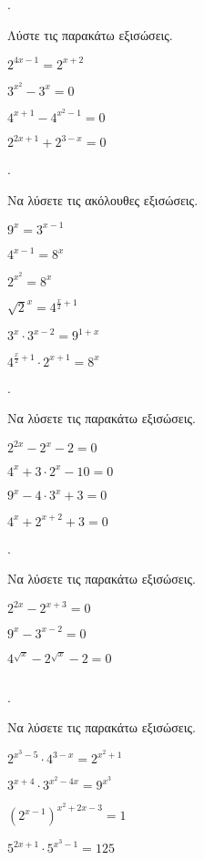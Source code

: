 \documentclass[11pt,a4paper,twocolumn]{article}
\newcounter{askhsh}
\newcommand{\askhsh}{\large\theaskhsh.\ \addtocounter{askhsh}{1}}
\begin{document}
\askhsh Λύστε τις παρακάτω εξισώσεις.
\begin{multicols}{2}
\begin{alist}
\item $2^{4x-1}=2^{x+2}$
\item $3^{x^2}-3^x=0$
\item $4^{x+1}-4^{x^2-1}=0$
\item $2^{2x+1}+2^{3-x}=0$
\end{alist}
\end{multicols}
\askhsh Να λύσετε τις ακόλουθες εξισώσεις.
\begin{multicols}{2}
\begin{alist}
\item $9^x=3^{x-1}$
\item $4^{x-1}=8^x$
\item $2^{x^2}=8^x$
\item $\sqrt{2}^x=4^{\frac{x}{2}+1}$
\item $3^x\cdot 3^{x-2}=9^{1+x}$
\item $4^{\frac{x}{2}+1}\cdot 2^{x+1}=8^{x}$
\end{alist}
\end{multicols}
\askhsh Να λύσετε τις παρακάτω εξισώσεις.
\begin{alist}
\item $2^{2x}-2^x-2=0$
\item $4^{x}+3\cdot 2^{x}-10=0$
\item $9^{x}-4\cdot 3^x+3=0$
\item $4^x+2^{x+2}+3=0$
\end{alist}
\askhsh Να λύσετε τις παρακάτω εξισώσεις.
\begin{alist}
\item $2^{2x}-2^{x+3}=0$
\item $9^x-3^{x-2}=0$
\item $4^{\sqrt{x}}-2^{\sqrt{x}}-2=0$
\item $ $
\end{alist}
\askhsh Να λύσετε τις παρακάτω εξισώσεις.
\begin{alist}
\item $2^{x^3-5}\cdot 4^{3-x}=2^{x^2+1}$
\item $3^{x+4}\cdot 3^{x^2-4x}=9^{x^3}$
\item $\left(2^{x-1}\right)^{x^2+2x-3}=1$
\item $5^{2x+1}\cdot 5^{x^3-1}=125$
\end{alist}
\end{document}
